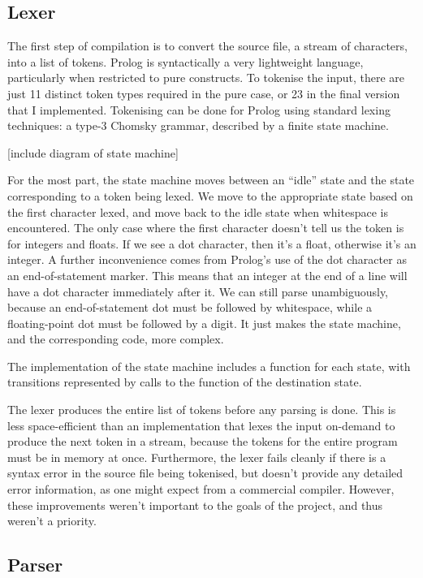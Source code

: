 \documentclass[12pt]{article}
\begin{document}
\subsection{Lexer}

The first step of compilation is to convert the source file, a stream of characters, into a list of tokens. 
Prolog is syntactically a very lightweight language, particularly when restricted to pure constructs. 
To tokenise the input, there are just 11 distinct token types required in the pure case, or 23 in the final version that I implemented. 
Tokenising can be done for Prolog using standard lexing techniques: a type-3 Chomsky grammar, described by a finite state machine. 

[include diagram of state machine]

For the most part, the state machine moves between an ``idle'' state and the state corresponding to a token being lexed. 
We move to the appropriate state based on the first character lexed, and move back to the idle state when whitespace is encountered. 
The only case where the first character doesn't tell us the token is for integers and floats. 
If we see a dot character, then it's a float, otherwise it's an integer. 
A further inconvenience comes from Prolog's use of the dot character as an end-of-statement marker. 
This means that an integer at the end of a line will have a dot character immediately after it. 
We can still parse unambiguously, because an end-of-statement dot must be followed by whitespace, while a floating-point dot must be followed by a digit. 
It just makes the state machine, and the corresponding code, more complex.

The implementation of the state machine includes a function for each state, with transitions represented by calls to the function of the destination state.

The lexer produces the entire list of tokens before any parsing is done. 
This is less space-efficient than an implementation that lexes the input on-demand to produce the next token in a stream, because the tokens for the entire program must be in memory at once. 
Furthermore, the lexer fails cleanly if there is a syntax error in the source file being tokenised, but doesn't provide any detailed error information, as one might expect from a commercial compiler. 
However, these improvements weren't important to the goals of the project, and thus weren't a priority.

\subsection{Parser}
\end{document}
